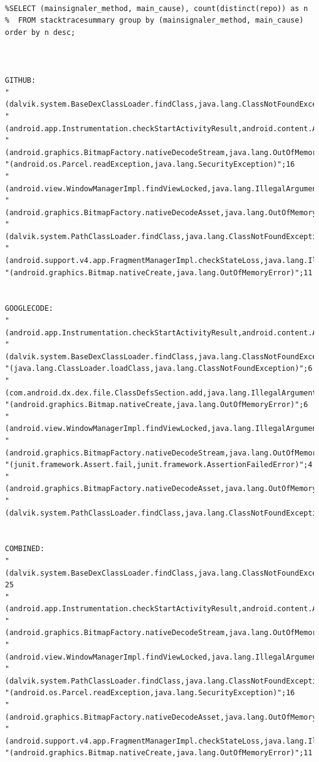 \documentclass[conference]{IEEEtran}
\begin{document}
{\tiny
\begin{verbatim}

%SELECT (mainsignaler_method, main_cause), count(distinct(repo)) as n
%  FROM stacktracesummary group by (mainsignaler_method, main_cause) order by n desc;



GITHUB:
"(dalvik.system.BaseDexClassLoader.findClass,java.lang.ClassNotFoundException)";19
"(android.app.Instrumentation.checkStartActivityResult,android.content.ActivityNotFoundException)";17
"(android.graphics.BitmapFactory.nativeDecodeStream,java.lang.OutOfMemoryError)";16
"(android.os.Parcel.readException,java.lang.SecurityException)";16
"(android.view.WindowManagerImpl.findViewLocked,java.lang.IllegalArgumentException)";14
"(android.graphics.BitmapFactory.nativeDecodeAsset,java.lang.OutOfMemoryError)";14
"(dalvik.system.PathClassLoader.findClass,java.lang.ClassNotFoundException)";13
"(android.support.v4.app.FragmentManagerImpl.checkStateLoss,java.lang.IllegalStateException)";12
"(android.graphics.Bitmap.nativeCreate,java.lang.OutOfMemoryError)";11


GOOGLECODE:
"(android.app.Instrumentation.checkStartActivityResult,android.content.ActivityNotFoundException)";8
"(dalvik.system.BaseDexClassLoader.findClass,java.lang.ClassNotFoundException)";6
"(java.lang.ClassLoader.loadClass,java.lang.ClassNotFoundException)";6
"(com.android.dx.dex.file.ClassDefsSection.add,java.lang.IllegalArgumentException)";6
"(android.graphics.Bitmap.nativeCreate,java.lang.OutOfMemoryError)";6
"(android.view.WindowManagerImpl.findViewLocked,java.lang.IllegalArgumentException)";5
"(android.graphics.BitmapFactory.nativeDecodeStream,java.lang.OutOfMemoryError)";5
"(junit.framework.Assert.fail,junit.framework.AssertionFailedError)";4
"(android.graphics.BitmapFactory.nativeDecodeAsset,java.lang.OutOfMemoryError)";4
"(dalvik.system.PathClassLoader.findClass,java.lang.ClassNotFoundException)";4


COMBINED:
"(dalvik.system.BaseDexClassLoader.findClass,java.lang.ClassNotFoundException)"; 25
"(android.app.Instrumentation.checkStartActivityResult,android.content.ActivityNotFoundException)";25
"(android.graphics.BitmapFactory.nativeDecodeStream,java.lang.OutOfMemoryError)";21
"(android.view.WindowManagerImpl.findViewLocked,java.lang.IllegalArgumentException)";19
"(dalvik.system.PathClassLoader.findClass,java.lang.ClassNotFoundException)";17
"(android.os.Parcel.readException,java.lang.SecurityException)";16
"(android.graphics.BitmapFactory.nativeDecodeAsset,java.lang.OutOfMemoryError)";14
"(android.support.v4.app.FragmentManagerImpl.checkStateLoss,java.lang.IllegalStateException)";12
"(android.graphics.Bitmap.nativeCreate,java.lang.OutOfMemoryError)";11


\end{verbatim}}
\end{document}

